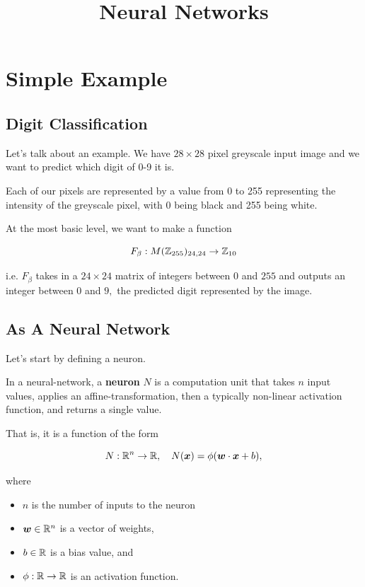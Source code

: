 \documentclass{article}
\title{Neural Networks}
\begin{document}
\section{Simple Example}

\subsection{Digit Classification}
Let's talk about an example. We have $28 \times 28$ pixel greyscale input image and we want to predict which digit of 0-9 it is.

Each of our pixels are represented by a value from 0 to 255 representing the intensity of the greyscale pixel, with 0 being black and 255 being white.

At the most basic level, we want to make a function

\[ F_{\beta} : M(\mathbb{Z}_{255})_{24,24} \to \mathbb{Z}_{10} \]

i.e. $F_{\beta}$ takes in a $24 \times 24$ matrix of \@{integers} between $0$ and $255$ and outputs an integer between $0$ and $9,$ the predicted digit represented by the image.

\subsection{As A Neural Network}

Let's start by defining a neuron.

\begin{definition}[Neuron]
In a \@{neural-network}, a \textbf{neuron} $N$ is a computation unit that takes $n$ input values, applies an \@{affine-transformation}, then a typically non-linear activation function, and returns a single value.

That is, it is a function of the form

\[ N: \mathbb{R}^n \to \mathbb{R}, \quad N(\boldsymbol{x}) = \phi(\boldsymbol{w} \cdot \boldsymbol{x} + b), \]

where

\begin{itemize}
\item $n$ is the number of inputs to the neuron
\end{itemize}

\begin{itemize}
\item $\boldsymbol{w} \in \mathbb{R}^n$ is a \@{vector} of weights,
\end{itemize}

\begin{itemize}
\item $b \in \mathbb{R}$ is a bias value, and
\end{itemize}

\begin{itemize}
\item $\phi : \mathbb{R} \to \mathbb{R}$ is an activation function.
\end{itemize}
\end{definition}
\end{document}
